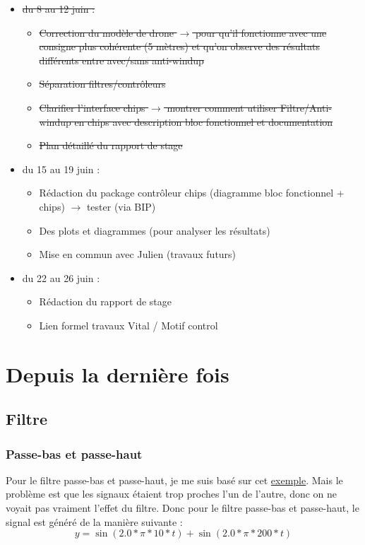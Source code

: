 \documentclass{article}
\begin{document}
\begin{itemize}
    \item \sout{du 8 au 12 juin :} 
    \begin{itemize}
        \item \sout{Correction du modèle de drone $\rightarrow$ pour qu'il fonctionne avec une consigne plus cohérente (5 mètres) et qu'on observe des résultats différents entre avec/sans anti-windup}
        \item \sout{Séparation filtres/contrôleurs}
        \item \sout{Clarifier l'interface chips $\rightarrow$ montrer comment utiliser Filtre/Anti-windup en chips avec description bloc fonctionnel et documentation}
        \item \sout{Plan détaillé du rapport de stage}
    \end{itemize}
    \item du 15 au 19 juin :
    \begin{itemize}
        \item Rédaction du package contrôleur chips (diagramme bloc fonctionnel + chips) $\rightarrow$ tester (via BIP)
        \item Des plots et diagrammes (pour analyser les résultats)
        \item Mise en commun avec Julien (travaux futurs)
    \end{itemize}
    \item du 22 au 26 juin :
    \begin{itemize}
        \item Rédaction du rapport de stage
        \item Lien formel travaux Vital / Motif control
    \end{itemize}
\end{itemize}

\section{Depuis la dernière fois}

\subsection{Filtre}

\subsubsection{Passe-bas et passe-haut}

Pour le filtre passe-bas et passe-haut, je me suis basé sur cet \href{https://www.geeksforgeeks.org/python/noise-removal-using-lowpass-digital-butterworth-filter-in-scipy-python/}{exemple}.
Mais le problème est que les signaux étaient trop proches l'un de l'autre, donc on ne voyait pas vraiment l'effet du filtre. 
Donc pour le filtre passe-bas et passe-haut, le signal est généré de la manière suivante :
$$y = \sin(2.0 * \pi * 10 * t) + \sin(2.0 * \pi * 200 * t)$$
\end{document}
